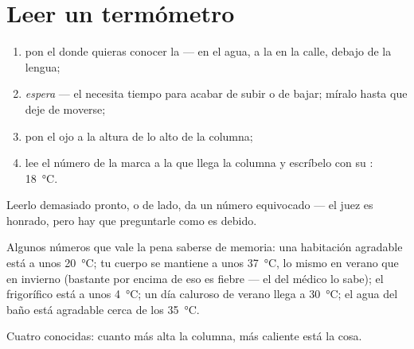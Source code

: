 \section{Leer un termómetro}

\begin{method}\label{met:g3:temperature-thermometers:read}
\begin{enumerate}
  \item pon el  donde quieras conocer la  ---
        en el agua, a la  en la calle, debajo de la lengua;
  \item \emph{espera} --- el  necesita tiempo para acabar de
        subir o de bajar; míralo hasta que deje de moverse;
  \item pon el ojo a la altura de lo alto de la columna;
  \item lee el número de la marca a la que llega la columna y
        escríbelo con su : \qty{18}{\celsius}.
\end{enumerate}
Leerlo demasiado pronto, o de lado, da un número equivocado --- el
juez es honrado, pero hay que preguntarle como es debido.
\end{method}

\begin{example}\label{ex:g3:temperature-thermometers:livedby}
Algunos números que vale la pena saberse de memoria: una habitación
agradable está a unos \qty{20}{\celsius}; tu cuerpo se mantiene a unos
\qty{37}{\celsius}, lo mismo en verano que en invierno (bastante por
encima de eso es fiebre --- el  del médico lo sabe); el
frigorífico está a unos \qty{4}{\celsius}; un día caluroso de verano
llega a \qty{30}{\celsius}; el agua del baño está agradable cerca de
los \qty{35}{\celsius}.
\end{example}

\begin{omfigure}

{\small Cuatro  conocidas: cuanto más alta la columna, más
caliente está la cosa.}
\end{omfigure}

